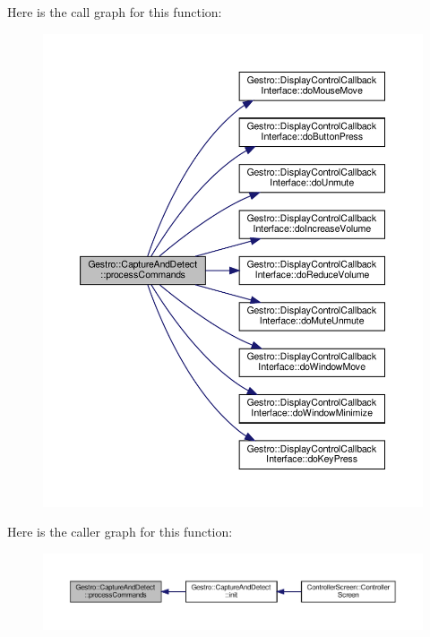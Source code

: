 Here is the call graph for this function\+:
\nopagebreak
\begin{figure}[H]
\begin{center}
\leavevmode
\includegraphics[width=350pt]{class_gestro_1_1_capture_and_detect_a5747ba4779f2f30b599c5082088841ed_cgraph}
\end{center}
\end{figure}
Here is the caller graph for this function\+:
\nopagebreak
\begin{figure}[H]
\begin{center}
\leavevmode
\includegraphics[width=350pt]{class_gestro_1_1_capture_and_detect_a5747ba4779f2f30b599c5082088841ed_icgraph}
\end{center}
\end{figure}
\mbox{\label{class_gestro_1_1_capture_and_detect_ac7e70bbcade4e0023541c556ee7cb34e}} 
